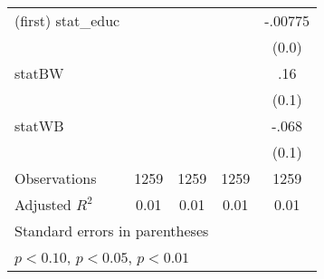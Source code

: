 \begin{table}[htbp]
\begin{tabular}{l*{4}{c}}
(first) stat\_educ&                  &                  &                  &  -.00775         \\
                &                  &                  &                  &    (0.0)         \\
statBW          &                  &                  &                  &      .16         \\
                &                  &                  &                  &    (0.1)         \\
statWB          &                  &                  &                  &    -.068         \\
                &                  &                  &                  &    (0.1)         \\
\hline
Observations    &     1259         &     1259         &     1259         &     1259         \\
Adjusted \(R^{2}\)&     0.01         &     0.01         &     0.01         &     0.01         \\
\hline\hline
\multicolumn{5}{l}{\footnotesize Standard errors in parentheses}\\
\multicolumn{5}{l}{\footnotesize \sym{*} \(p<0.10\), \sym{**} \(p<0.05\), \sym{***} \(p<0.01\)}\\
\end{tabular}
\end{table}
